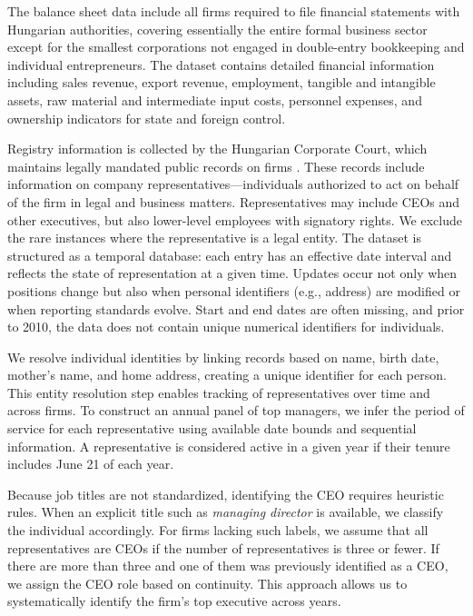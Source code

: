 \documentclass[11pt,a4paper]{article}
\begin{document}
The balance sheet data include all firms required to file financial statements with Hungarian authorities, covering essentially the entire formal business sector except for the smallest corporations not engaged in double-entry bookkeeping and individual entrepreneurs. The dataset contains detailed financial information including sales revenue, export revenue, employment, tangible and intangible assets, raw material and intermediate input costs, personnel expenses, and ownership indicators for state and foreign control.

Registry information is collected by the Hungarian Corporate Court, which maintains legally mandated public records on firms \citep{cegtv}. These records include information on company representatives---individuals authorized to act on behalf of the firm in legal and business matters. Representatives may include CEOs and other executives, but also lower-level employees with signatory rights. We exclude the rare instances where the representative is a legal entity. The dataset is structured as a temporal database: each entry has an effective date interval and reflects the state of representation at a given time. Updates occur not only when positions change but also when personal identifiers (e.g., address) are modified or when reporting standards evolve. Start and end dates are often missing, and prior to 2010, the data does not contain unique numerical identifiers for individuals.

We resolve individual identities by linking records based on name, birth date, mother's name, and home address, creating a unique identifier for each person. This entity resolution step enables tracking of representatives over time and across firms. To construct an annual panel of top managers, we infer the period of service for each representative using available date bounds and sequential information. A representative is considered active in a given year if their tenure includes June 21 of each year.

Because job titles are not standardized, identifying the CEO requires heuristic rules. When an explicit title such as \emph{managing director} is available, we classify the individual accordingly. For firms lacking such labels, we assume that all representatives are CEOs if the number of representatives is three or fewer. If there are more than three and one of them was previously identified as a CEO, we assign the CEO role based on continuity. This approach allows us to systematically identify the firm's top executive across years.
\end{document}
